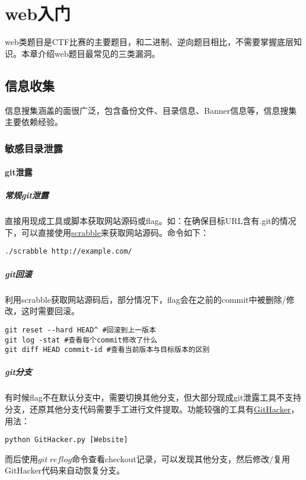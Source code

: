 \chapter{web入门}
web类题目是CTF比赛的主要题目，和二进制、逆向题目相比，不需要掌握底层知识。本章介绍web题目最常见的三类漏洞。


\section{信息收集}
信息搜集涵盖的面很广泛，包含备份文件、目录信息、Banner信息等，信息搜集主要依赖经验。


\subsection{敏感目录泄露}

\subsubsection*{git泄露}

\paragraph*{常规git泄露}
直接用现成工具或脚本获取网站源码或flag。如：在确保目标URL含有.git的情况下，可以直接使用\href{https://github.com/denny0223/scrabble}{scrabble}来获取网站源码。命令如下：
\begin{lstlisting}
./scrabble http://example.com/
\end{lstlisting}

\paragraph*{git回滚}
利用scrabble获取网站源码后，部分情况下，flag会在之前的commit中被删除/修改，这时需要回滚。
\begin{lstlisting}
git reset --hard HEAD^ #回滚到上一版本
git log -stat #查看每个commit修改了什么
git diff HEAD commit-id #查看当前版本与目标版本的区别
\end{lstlisting}

\paragraph*{git分支}
有时候flag不在默认分支中，需要切换其他分支，但大部分现成git泄露工具不支持分支，还原其他分支代码需要手工进行文件提取。功能较强的工具有\href{https://github.com/WangYihang/GitHacker}{GitHacker}，用法：
\begin{lstlisting}
python GitHacker.py [Website]
\end{lstlisting}
而后使用$git\ reflog$命令查看checkout记录，可以发现其他分支，然后修改/复用GitHacker代码来自动恢复分支。

